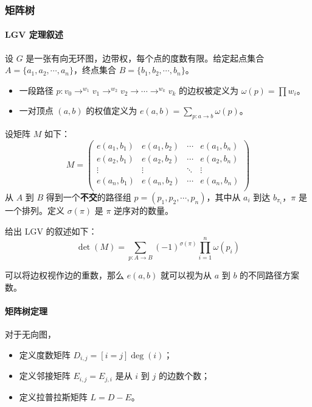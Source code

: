 \documentclass[10pt]{ctexart}
\providecommand{\tightlist}{\setlength{\itemsep}{0pt}\setlength{\parskip}{0pt}}
\begin{document}
\begin{multicols}{3}
    \subsubsection{矩阵树}\label{ux77e9ux9635ux6811}

    \paragraph{LGV 定理叙述}\label{lgv-ux5b9aux7406ux53d9ux8ff0}

    设 \(G\) 是一张有向无环图，边带权，每个点的度数有限。给定起点集合
    \(A=\{a_1,a_2, \cdots,a_n\}\)，终点集合
    \(B = \{b_1, b_2, \cdots,b_n\}\)。

    \begin{itemize}
    \tightlist
    \item
      一段路径
      \(p:v_0\to^{w_1} v_1\to^{w_2} v_2\to \cdots \to^{w_k} v_k\)
      的边权被定义为 \(\omega (p) = \prod w_i\)。
    \item
      一对顶点 \((a, b)\) 的权值定义为
      \(e(a, b) = \sum_{p:a\to b}\omega (p)\)。
    \end{itemize}

    设矩阵 \(M\) 如下：\[
    M = \begin{pmatrix}
    e(a_1, b_1) & e(a_1, b_2) & \cdots & e(a_1, b_n) \\
    e(a_2, b_1) & e(a_2, b_2) & \cdots & e(a_2, b_n) \\
    \vdots & \vdots & \ddots & \vdots \\
    e(a_n, b_1) & e(a_n, b_2) & \cdots & e(a_n, b_n) \\
    \end{pmatrix}
    \] 从 \(A\) 到 \(B\) 得到一个\textbf{不交}的路径组
    \(p=(p_1, p_2, \cdots,p_n)\)，其中从 \(a_i\) 到达
    \(b_{\pi_i}\)，\(\pi\) 是一个排列。定义 \(\sigma(\pi)\) 是 \(\pi\)
    逆序对的数量。

    给出 LGV 的叙述如下：\[
    \det(M) = \sum_{p:A\to B} (-1)^{\sigma (\pi)} \prod_{i=1}^n \omega(p_i)
    \]

    可以将边权视作边的重数，那么 \(e(a, b)\) 就可以视为从 \(a\) 到 \(b\)
    的不同路径方案数。

    \paragraph{矩阵树定理}\label{ux77e9ux9635ux6811ux5b9aux7406}

    对于无向图，

    \begin{itemize}
    \tightlist
    \item
      定义度数矩阵 \(D_{i, j} = [i=j]\deg(i)\)；
    \item
      定义邻接矩阵 \(E_{i, j} = E_{j, i}\) 是从 \(i\) 到 \(j\)
      的边数个数；
    \item
      定义拉普拉斯矩阵 \(L = D - E\)。
    \end{itemize}


\end{multicols}
\end{document}
